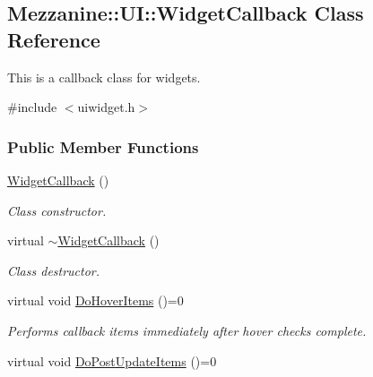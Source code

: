 \hypertarget{classMezzanine_1_1UI_1_1WidgetCallback}{
\subsection{Mezzanine::UI::WidgetCallback Class Reference}
\label{classMezzanine_1_1UI_1_1WidgetCallback}
}


This is a callback class for widgets.  




{\ttfamily \#include $<$uiwidget.h$>$}

\subsubsection*{Public Member Functions}
\begin{DoxyCompactItemize}
\item 
\hypertarget{classMezzanine_1_1UI_1_1WidgetCallback_a7d42c424322e006792251a727bf7f2c7}{
\hyperlink{classMezzanine_1_1UI_1_1WidgetCallback_a7d42c424322e006792251a727bf7f2c7}{WidgetCallback} ()}
\label{classMezzanine_1_1UI_1_1WidgetCallback_a7d42c424322e006792251a727bf7f2c7}

\begin{DoxyCompactList}\small\item\em Class constructor. \item\end{DoxyCompactList}\item 
\hypertarget{classMezzanine_1_1UI_1_1WidgetCallback_ad0f5cbd659849f3f69e1b1637c63402a}{
virtual \hyperlink{classMezzanine_1_1UI_1_1WidgetCallback_ad0f5cbd659849f3f69e1b1637c63402a}{$\sim$WidgetCallback} ()}
\label{classMezzanine_1_1UI_1_1WidgetCallback_ad0f5cbd659849f3f69e1b1637c63402a}

\begin{DoxyCompactList}\small\item\em Class destructor. \item\end{DoxyCompactList}\item 
\hypertarget{classMezzanine_1_1UI_1_1WidgetCallback_ab0efad1230a035f7f03bbf385a48e783}{
virtual void \hyperlink{classMezzanine_1_1UI_1_1WidgetCallback_ab0efad1230a035f7f03bbf385a48e783}{DoHoverItems} ()=0}
\label{classMezzanine_1_1UI_1_1WidgetCallback_ab0efad1230a035f7f03bbf385a48e783}

\begin{DoxyCompactList}\small\item\em Performs callback items immediately after hover checks complete. \item\end{DoxyCompactList}\item 
\hypertarget{classMezzanine_1_1UI_1_1WidgetCallback_a62c3b86e1727b8ee98a2b1cc14e96c26}{
virtual void \hyperlink{classMezzanine_1_1UI_1_1WidgetCallback_a62c3b86e1727b8ee98a2b1cc14e96c26}{DoPostUpdateItems} ()=0}
\label{classMezzanine_1_1UI_1_1WidgetCallback_a62c3b86e1727b8ee98a2b1cc14e96c26}


\end{DoxyCompactItemize}
